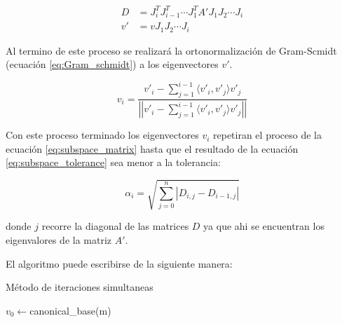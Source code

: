 \begin{align*}
    D  & = J_i^TJ_{i-1}^T\cdots J_1^TA' J_1J_2\cdots J_i \\
    v' & = vJ_1J_2\cdots J_i
\end{align*}

Al termino de este proceso se realizará la ortonormalización de Gram-Scmidt (ecuación \ref{eq:Gram_schmidt}) a los eigenvectores $v'$.

\begin{equation}
    v_i = \frac{v'_i - \sum\limits_{j=1}^{i-1} \langle v'_i ,v'_j \rangle v'_j}{\left |\left |v'_i - \sum\limits_{j=1}^{i-1} \langle v'_i ,v'_j \rangle v'_j \right |\right |} \label{eq:Gram_schmidt}
\end{equation}

Con este proceso terminado los eigenvectores $v_i$ repetiran el proceso de la ecuación \ref{eq:subspace_matrix} hasta que el resultado de la ecuación \ref{eq:subspace_tolerance} sea menor a la tolerancia:

\begin{equation}
    \alpha_i = \sqrt{\sum_{j=0}^{n} |D_{i,j}-D_{i-1,j}|} \label{eq:subspace_tolerance}
\end{equation}

donde $j$ recorre la diagonal de las matrices $D$ ya que ahi se encuentran los eigenvalores de la matriz $A'$.

El algoritmo puede escribirse de la siguiente manera:

\begin{algorithm}[H]
    \caption{Método de iteraciones simultaneas}
    \label{alg:simultaneous_iterations}
    $v_0 \gets $canonical\_base(m)\\
\end{algorithm}